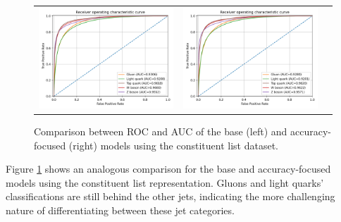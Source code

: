 \begin{figure}[!hpt]
  \centering
  \begin{tabular}{ccc}
      {\includegraphics[width=0.48\columnwidth]{evaluation/ROC_base_constituent.png}} &
      {\includegraphics[width=0.48\columnwidth]{evaluation/ROC_constituent.png}}
  \end{tabular}
  \caption{Comparison between ROC and AUC of the base (left) and accuracy-focused (right) models using the constituent list dataset.}
  \label{fig:ROCs-constituent}
\end{figure}

Figure \ref{fig:ROCs-constituent} shows an analogous comparison for the base and accuracy-focused models using the constituent list representation. Gluons and light quarks' classifications are still behind the other jets, indicating the more challenging nature of differentiating between these jet categories.

